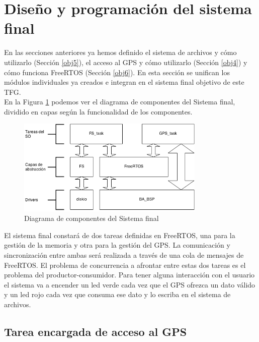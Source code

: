 \section{Diseño y programación del sistema final}
\label{obj7}

En las secciones anteriores ya hemos definido el sistema de archivos y cómo utilizarlo (Sección \ref{obj5}), el acceso al GPS y cómo utilizarlo (Sección \ref{obj4}) y cómo funciona FreeRTOS (Sección \ref{obj6}). En esta sección se unifican los módulos individuales ya creados e integran en el sistema final objetivo de este TFG.\\

En la Figura \ref{fig:allSystem} podemos ver el diagrama de componentes del Sistema final, dividido en capas según la funcionalidad de los componentes.\\

\begin{figure}[!h]
\begin{center}
\includegraphics[width=0.8\textwidth]{figs/allSystem.png}
\caption{Diagrama de componentes del Sistema final}
\label{fig:allSystem}
\end{center}
\end{figure}

El sistema final constará de dos tareas definidas en FreeRTOS, una para la gestión de la memoria y otra para la gestión del GPS. La comunicación y sincronización entre ambas será realizada a través de una cola de mensajes de FreeRTOS. El problema de concurrencia a afrontar entre estas dos tareas es el problema del productor-consumidor. Para tener alguna interacción con el usuario el sistema va a encender un led verde cada vez que el GPS ofrezca un dato válido y un led rojo cada vez que consuma ese dato y lo escriba en el sistema de archivos.\\

\subsection{Tarea encargada de acceso al GPS}


